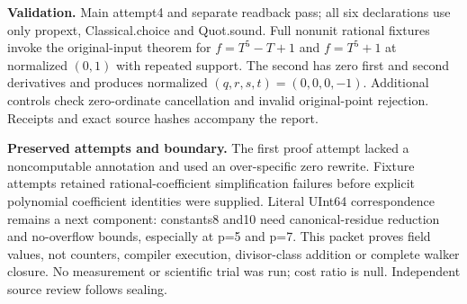 \documentclass[10pt]{article}
\begin{document}
\textbf{Validation.} Main attempt4 and separate readback pass; all six declarations use only propext, Classical.choice and Quot.sound. Full nonunit rational fixtures invoke the original-input theorem for $f=T^5-T+1$ and $f=T^5+1$ at normalized $(0,1)$ with repeated support. The second has zero first and second derivatives and produces normalized $(q,r,s,t)=(0,0,0,-1)$. Additional controls check zero-ordinate cancellation and invalid original-point rejection. Receipts and exact source hashes accompany the report.

\textbf{Preserved attempts and boundary.} The first proof attempt lacked a noncomputable annotation and used an over-specific zero rewrite. Fixture attempts retained rational-coefficient simplification failures before explicit polynomial coefficient identities were supplied. Literal UInt64 correspondence remains a next component: constants8 and10 need canonical-residue reduction and no-overflow bounds, especially at p=5 and p=7. This packet proves field values, not counters, compiler execution, divisor-class addition or complete walker closure. No measurement or scientific trial was run; cost ratio is null. Independent source review follows sealing.
\end{document}
